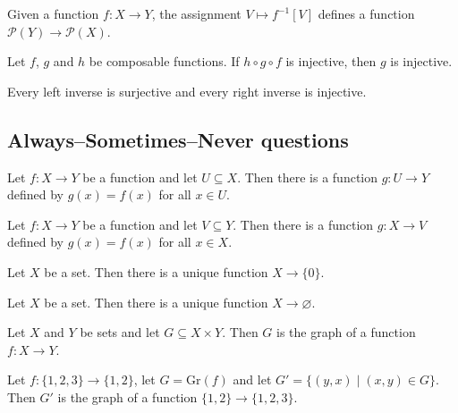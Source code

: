 \begin{chapex} %
Given a function $f : X \to Y$, the assignment $V \mapsto f^{-1}[V]$ defines a function $\mathcal{P}(Y) \to \mathcal{P}(X)$.
\end{chapex}

\begin{chapex} %
Let $f$, $g$ and $h$ be composable functions. If $h \circ g \circ f$ is injective, then $g$ is injective.
\end{chapex}

\begin{chapex} %
\label{cqFunctionsTFEnd}
Every left inverse is surjective and every right inverse is injective.
\end{chapex}

\subsection*{Always--Sometimes--Never questions}


\begin{chapex} %
\label{cqFunctionsASNBegin}
Let $f : X \to Y$ be a function and let $U \subseteq X$. Then there is a function $g : U \to Y$ defined by $g(x) = f(x)$ for all $x \in U$.
\end{chapex}

\begin{chapex} %
Let $f : X \to Y$ be a function and let $V \subseteq Y$. Then there is a function $g : X \to V$ defined by $g(x) = f(x)$ for all $x \in X$.
\end{chapex}

\begin{chapex} %
Let $X$ be a set. Then there is a unique function $X \to \{ 0 \}$.
\end{chapex}

\begin{chapex} %
Let $X$ be a set. Then there is a unique function $X \to \varnothing$.
\end{chapex}

\begin{chapex} %
Let $X$ and $Y$ be sets and let $G \subseteq X \times Y$. Then $G$ is the graph of a function $f : X \to Y$.
\end{chapex}

\begin{chapex} %
Let $f : \{ 1, 2, 3 \} \to \{ 1, 2 \}$, let $G = \mathrm{Gr}(f)$ and let $G' = \{ (y,x) \mid (x,y) \in G \}$. Then $G'$ is the graph of a function $\{ 1, 2 \} \to \{ 1, 2, 3 \}$.
\end{chapex}

